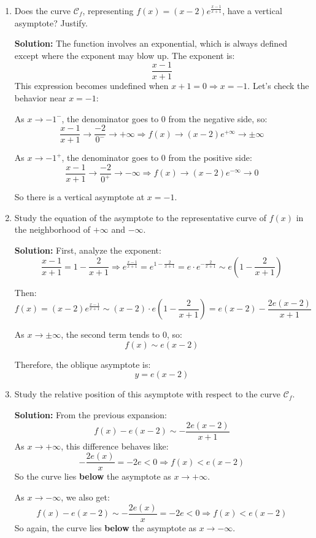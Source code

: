 \documentclass[12pt]{article}
\begin{document}
\newpage

\begin{answerbox}
  \begin{enumerate}
    \item Does the curve $\mathcal{C}_f$, representing $f(x) = (x - 2)e^{\frac{x-1}{x+1}}$, have a vertical asymptote? Justify.

    \textbf{Solution:}  
    The function involves an exponential, which is always defined except where the exponent may blow up. The exponent is:
    $$
    \frac{x - 1}{x + 1}
    $$
    This expression becomes undefined when $x + 1 = 0 \Rightarrow x = -1$. Let's check the behavior near $x = -1$:

    As $x \to -1^-$, the denominator goes to 0 from the negative side, so:
    $$
    \frac{x - 1}{x + 1} \to \frac{-2}{0^-} \to +\infty \Rightarrow f(x) \to (x - 2)e^{+\infty} \to \pm\infty
    $$

    As $x \to -1^+$, the denominator goes to 0 from the positive side:
    $$
    \frac{x - 1}{x + 1} \to \frac{-2}{0^+} \to -\infty \Rightarrow f(x) \to (x - 2)e^{-\infty} \to 0
    $$

    So there is a vertical asymptote at $x = -1$.

    \item Study the equation of the asymptote to the representative curve of $f(x)$ in the neighborhood of $+\infty$ and $-\infty$.

    \textbf{Solution:}  
    First, analyze the exponent:
    $$
    \frac{x - 1}{x + 1} = 1 - \frac{2}{x + 1}
    \Rightarrow e^{\frac{x - 1}{x + 1}} = e^{1 - \frac{2}{x + 1}} = e \cdot e^{-\frac{2}{x + 1}}
    \sim e \left(1 - \frac{2}{x + 1}\right)
    $$

    Then:
    $$
    f(x) = (x - 2)e^{\frac{x - 1}{x + 1}} \sim (x - 2)\cdot e \left(1 - \frac{2}{x + 1} \right)
    = e(x - 2) - \frac{2e(x - 2)}{x + 1}
    $$

    As $x \to \pm\infty$, the second term tends to 0, so:
    $$
    f(x) \sim e(x - 2)
    $$

    Therefore, the oblique asymptote is:
    $$
    y = e(x - 2)
    $$

    \item Study the relative position of this asymptote with respect to the curve $\mathcal{C}_f$.

    \textbf{Solution:}  
    From the previous expansion:
    $$
    f(x) - e(x - 2) \sim -\frac{2e(x - 2)}{x + 1}
    $$
    As $x \to +\infty$, this difference behaves like:
    $$
    -\frac{2e(x)}{x} = -2e < 0 \Rightarrow f(x) < e(x - 2)
    $$
    So the curve lies \textbf{below} the asymptote as $x \to +\infty$.

    As $x \to -\infty$, we also get:
    $$
    f(x) - e(x - 2) \sim -\frac{2e(x)}{x} = -2e < 0 \Rightarrow f(x) < e(x - 2)
    $$
    So again, the curve lies \textbf{below} the asymptote as $x \to -\infty$.
\end{enumerate}
\end{answerbox}

\end{document}
